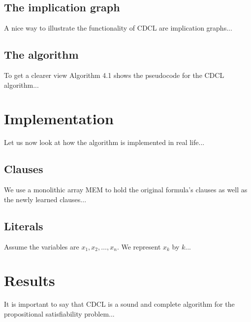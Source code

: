 \subsection{The implication graph}

A nice way to illustrate the functionality of CDCL are implication graphs...

\subsection{The algorithm}

To get a clearer view Algorithm 4.1 shows the pseudocode for the CDCL algorithm...

\section{Implementation}

Let us now look at how the algorithm is implemented in real life...

\subsection{Clauses}

We use a monolithic array MEM to hold the original formula’s clauses as well as the newly learned clauses...

\subsection{Literals}

Assume the variables are \(x_1, x_2, \ldots, x_n\). We represent \(x_k\) by \(k\)...

\section{Results}

It is important to say that CDCL is a sound and complete algorithm for the propositional satisfiability problem...
